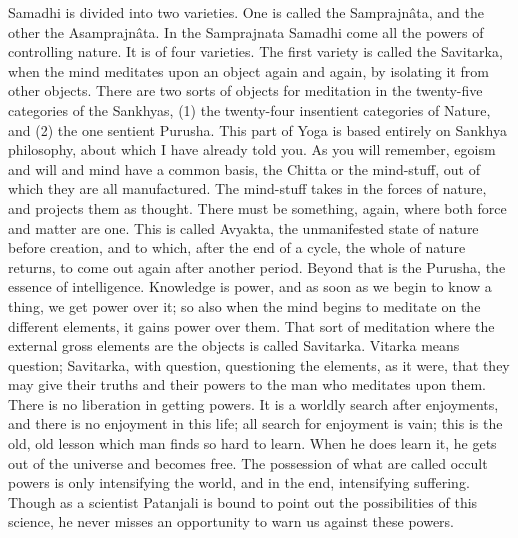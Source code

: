 Samadhi is divided into two varieties. One is called the
Samprajnâta, and the other the Asamprajnâta. In the Samprajnata Samadhi
come all the powers of controlling nature. It is of four varieties. The
first variety is called the Savitarka, when the mind meditates upon an
object again and again, by isolating it from other objects. There are
two sorts of objects for meditation in the twenty-five categories of
the Sankhyas, (1) the twenty-four insentient categories of Nature, and
(2) the one sentient Purusha. This part of Yoga is based entirely on
Sankhya philosophy, about which I have already told you. As you will
remember, egoism and will and mind have a common basis, the Chitta or
the mind-stuff, out of which they are all manufactured. The mind-stuff
takes in the forces of nature, and projects them as thought. There must
be something, again, where both force and matter are one.
This is called Avyakta, the unmanifested state of nature before
creation, and to which, after the end of a cycle, the whole of nature
returns, to come out again after another period. Beyond that is the
Purusha, the essence of intelligence. Knowledge is power, and as soon
as we begin to know a thing, we get power over it; so also when the
mind begins to meditate on the different elements, it gains power over
them. That sort of meditation where the external gross elements are the
objects is called Savitarka. Vitarka means question; Savitarka, with
question, questioning the elements, as it were, that they may give
their truths and their powers to the man who meditates upon them. There
is no liberation in getting powers. It is a worldly search after
enjoyments, and there is no enjoyment in this life; all search for
enjoyment is vain; this is the old, old lesson which man finds so hard
to learn. When he does learn it, he gets out of the universe and
becomes free. The possession of what are called occult powers is only
intensifying the world, and in the end, intensifying suffering. Though
as a scientist Patanjali is bound to point out the possibilities of
this science, he never misses an opportunity to warn us against these
powers. \\

